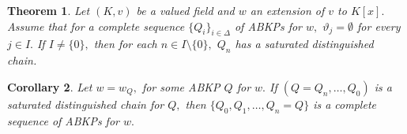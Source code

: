 \documentclass[11pt]{amsart}
\newtheorem{theorem}{Theorem}[section]
\newtheorem{corollary}[theorem]{Corollary}
\theoremstyle{definition}
\theoremstyle{remark}
\numberwithin{equation}{section}
\begin{document}
	 \begin{theorem}\label{3.1.22}
	 	Let $(K,v)$ be a valued field
	 	and  $w$  an extension of $v$ to $K[x].$ Assume that for a complete sequence $\{Q_i\}_{i\in\Delta}$ of ABKPs for $w,$    $\vartheta_j=\emptyset$  for every $j\in I.$ If $I\neq \{0\},$ then for each $n\in I\setminus \{0\},$  $Q_n$ has a saturated distinguished chain.
	 \end{theorem}
	 \begin{corollary}\label{cor3.1.7}
	 	Let $w=w_Q,$ for some ABKP $Q$ for $w.$ If $(Q=Q_n,\ldots, Q_0)$ is a saturated distinguished chain for $Q,$ then $\{Q_0, Q_{1},\ldots,Q_n=Q\}$ is a complete sequence of ABKPs for $w.$ 
	 \end{corollary}
\end{document}

